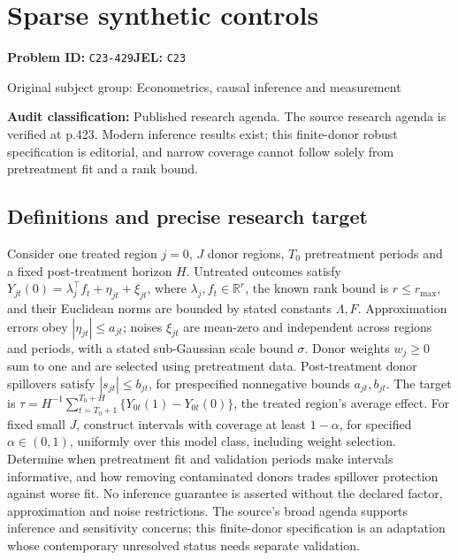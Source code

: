 \documentclass[11pt,a4paper]{article}
\begin{document}
\section*{Sparse synthetic controls}
\textbf{Problem ID:} \texttt{C23-429}\quad \textbf{JEL:} \texttt{C23}\par
\label{problem:OP-0425}
{\sffamily\small\color{muted}Original subject group: Econometrics, causal inference and measurement\par}
\label{definitions:problem:30007707}
\textbf{Audit classification:} Published research agenda. The source research agenda is verified at p.423. Modern inference results exist; this finite-donor robust specification is editorial, and narrow coverage cannot follow solely from pretreatment fit and a rank bound.
\subsection*{Definitions and precise research target}
Consider one treated region \(j=0\), \(J\) donor regions, \(T_0\) pretreatment periods and a fixed post-treatment horizon \(H\). Untreated outcomes satisfy \(Y_{jt}(0)=\lambda_j^\top f_t+\eta_{jt}+\xi_{jt}\), where \(\lambda_j,f_t\in\mathbb R^r\), the known rank bound is \(r\leq r_{\max}\), and their Euclidean norms are bounded by stated constants \(\Lambda,F\). Approximation errors obey \(|\eta_{jt}|\leq a_{jt}\); noises \(\xi_{jt}\) are mean-zero and independent across regions and periods, with a stated sub-Gaussian scale bound \(\sigma\). Donor weights \(w_j\geq0\) sum to one and are selected using pretreatment data. Post-treatment donor spillovers satisfy \(|s_{jt}|\leq b_{jt}\), for prespecified nonnegative bounds \(a_{jt},b_{jt}\). The target is \(\tau=H^{-1}\sum_{t=T_0+1}^{T_0+H}\{Y_{0t}(1)-Y_{0t}(0)\}\), the treated region's average effect. For fixed small \(J\), construct intervals with coverage at least \(1-\alpha\), for specified \(\alpha\in(0,1)\), uniformly over this model class, including weight selection. Determine when pretreatment fit and validation periods make intervals informative, and how removing contaminated donors trades spillover protection against worse fit. No inference guarantee is asserted without the declared factor, approximation and noise restrictions. The source's broad agenda supports inference and sensitivity concerns; this finite-donor specification is an adaptation whose contemporary unresolved status needs separate validation.
\end{document}
